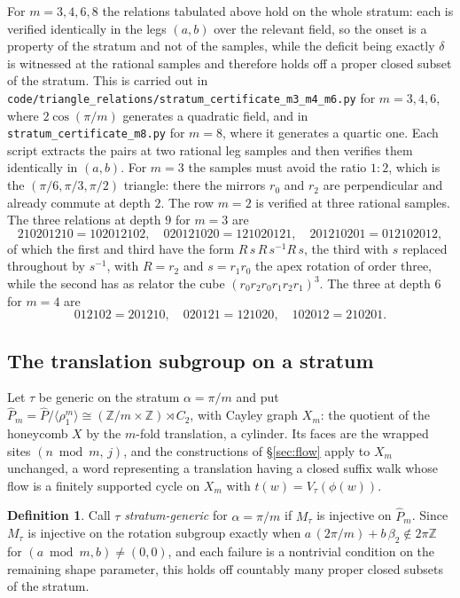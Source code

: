 \documentclass[11pt]{article}
\theoremstyle{definition}
\newtheorem{definition}[theorem]{Definition}
\theoremstyle{remark}
\newcommand{\Z}{\mathbb{Z}}
\begin{document}
For $m=3,4,6,8$ the relations tabulated above hold on the whole stratum: each
is verified identically in the legs $(a,b)$ over the relevant field, so the
onset is a property of the stratum and not of the samples, while the deficit
being exactly $\delta$ is witnessed at the rational samples and therefore
holds off a proper closed subset of the stratum. This is carried out in
\texttt{code/triangle\_relations/stratum\_certificate\_m3\_m4\_m6.py} for
$m=3,4,6$, where $2\cos(\pi/m)$ generates a quadratic field, and in
\texttt{stratum\_certificate\_m8.py} for $m=8$, where it generates a quartic
one. Each script extracts the pairs at two rational leg samples and then
verifies them identically in $(a,b)$. For $m=3$ the samples must avoid the
ratio $1:2$, which is the $(\pi/6,\pi/3,\pi/2)$ triangle: there the mirrors
$r_0$ and $r_2$ are perpendicular and already commute at depth $2$. The row
$m=2$ is verified at three rational samples. The three relations at depth $9$ for $m=3$ are
\[
 210201210=102012102,\quad 020121020=121020121,\quad 201210201=012102012,
\]
of which the first and third have the form $R\,s\,R\,s^{-1}R\,s$, the third with
$s$ replaced throughout by $s^{-1}$, with $R=r_2$
and $s=r_1r_0$ the apex rotation of order three, while the second has as
relator the cube $(r_0r_2r_0r_1r_2r_1)^3$. The three at depth $6$ for $m=4$
are
\[
 012102=201210,\quad 020121=121020,\quad 102012=210201 .
\]

\subsection{The translation subgroup on a stratum}

Let $\tau$ be generic on the stratum $\alpha=\pi/m$ and put
$\widehat P_m=\widehat P/\langle\rho_1^m\rangle\cong(\Z/m\times\Z)\rtimes C_2$,
with Cayley graph $X_m$: the quotient of the honeycomb $X$ by the $m$-fold
translation, a cylinder. Its faces are the wrapped sites $(n\bmod m,\,j)$, and
the constructions of \S\ref{sec:flow} apply to $X_m$ unchanged, a word
representing a translation having a closed suffix walk whose flow is a finitely
supported cycle on $X_m$ with $t(w)=V_\tau(\phi(w))$.

\begin{definition}\label{def:stratgen}
Call $\tau$ \emph{stratum-generic} for $\alpha=\pi/m$ if $M_\tau$ is injective
on $\widehat P_m$. Since $M_\tau$ is injective on the rotation subgroup exactly
when $a\,(2\pi/m)+b\,\beta_2\notin2\pi\Z$ for $(a\bmod m,b)\neq(0,0)$, and
each failure is a nontrivial condition on the remaining shape parameter, this
holds off countably many proper closed subsets of the stratum.
\end{definition}
\end{document}
